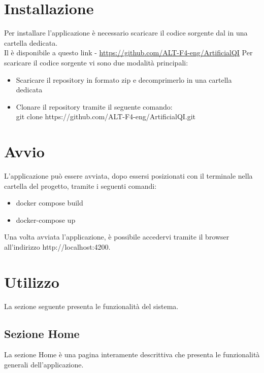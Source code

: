 \section{Installazione}
\label{sec:installazione}

Per installare l'applicazione è necessario scaricare il codice sorgente dal  in una cartella dedicata.\\
Il  è disponibile a questo link - \href{https://github.com/ALT-F4-eng/ArtificialQI}{https://github.com/ALT-F4-eng/ArtificialQI}
Per scaricare il codice sorgente vi sono due modalità principali:
\begin{itemize}
    \item Scaricare il repository in formato zip e decomprimerlo in una cartella dedicata
    \item Clonare il repository tramite il seguente comando:\\
     git clone https://github.com/ALT-F4-eng/ArtificialQI.git
\end{itemize}

\section{Avvio}
\label{sec:avvio}

L’applicazione può essere avviata, dopo essersi posizionati con il terminale nella cartella del progetto, tramite i seguenti comandi:
\begin{itemize}
    \item docker compose build
    \item docker-compose up
\end{itemize}
Una volta avviata l’applicazione, è possibile accedervi tramite il browser all’indirizzo http://localhost:4200.

\section{Utilizzo}
\label{sec:utilizzo}

La sezione seguente presenta le funzionalità del sistema.

\subsection{Sezione Home}
\label{subsec:sezione_home}

La sezione Home è una pagina interamente descrittiva che presenta le funzionalità generali dell'applicazione.

